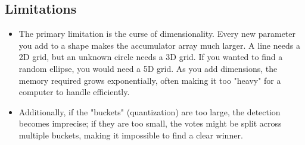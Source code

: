 \documentclass[12pt]{article}
\begin{document}
\subsection{Limitations}

\begin{itemize}
    \item The primary limitation is the curse of dimensionality. Every new parameter you add to a shape makes the accumulator array much larger. A line needs a 2D grid, but an unknown circle needs a 3D grid. If you wanted to find a random ellipse, you would need a 5D grid. As you add dimensions, the memory required grows exponentially, often making it too "heavy" for a computer to handle efficiently.

    \item Additionally, if the "buckets" (quantization) are too large, the detection becomes imprecise; if they are too small, the votes might be split across multiple buckets, making it impossible to find a clear winner.
\end{itemize}
\end{document}
